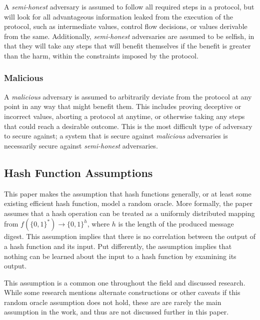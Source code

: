 A \emph{semi-honest} adversary is assumed to follow all required steps in a protocol, but will look for all advantageous information leaked from the execution of the protocol, such as intermediate values, control flow decisions, or values derivable from the same\cite{goldreich1998secure}.  Additionally, \emph{semi-honest} adversaries are assumed to be selfish, in that they will take any steps that will benefit themselves if the benefit is greater than the harm, within the constraints imposed by the protocol.


\subsubsection{Malicious}

A \emph{malicious} adversary is assumed to arbitrarily deviate from the protocol at any point in any way that might benefit them\cite{goldreich1998secure}.  This includes proving deceptive or incorrect values, aborting a protocol at anytime, or otherwise taking any steps that could reach a desirable outcome.  This is the most difficult type of adversary to secure against; a system that is secure against \emph{malicious} adversaries is necessarily secure against \emph{semi-honest} adversaries.


\subsection{Hash Function Assumptions}

This paper makes the assumption that hash functions generally, or at least some existing efficient hash function, model a random oracle.  More formally, the paper assumes that a hash operation can be treated as a uniformly distributed mapping from $f(\{0, 1\}^{*}) \to \{0, 1\}^{h}$, where $h$ is the length of the produced message digest.  This assumption implies that there is no correlation between the output of a hash function and its input.  Put differently, the assumption implies that nothing can be learned about the input to a hash function by examining its output.

This assumption is a common one throughout the field and discussed research\cite{pinkas2009secure}.  While some research mentions alternate constructions or other caveats if this random oracle assumption does not hold, these are are rarely the main assumption in the work, and thus are not discussed further in this paper.
